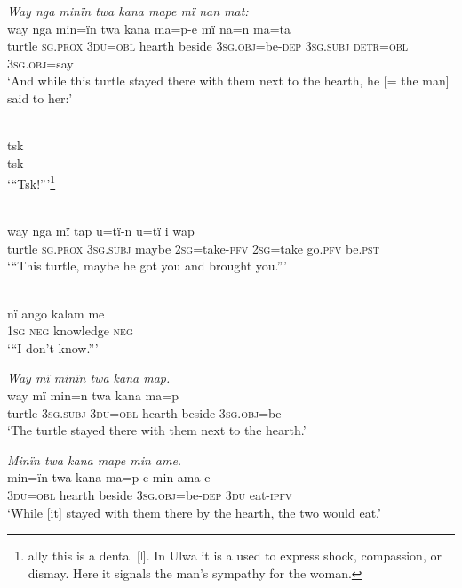 \ex \negmedspace \textit{Way nga min}{\textit{ï}}\textit{n twa k}{\textit{a}}\textit{na mape mï nan mat:}\\
\gll way  nga      min{=}{ï}{n} t{wa} k{a}na  {m}a{=}p{{}-}e      mï na{=}n ma{=}ta\\
turtle  \textsc{sg.prox}  3\textsc{du=obl}  hearth  beside  3\textsc{sg.obj}=be-\textsc{dep}  \textsc{3sg.subj} \textsc{detr=obl}  3\textsc{sg.obj}=say\\
\glt ‘And while this turtle stayed there with them next to the hearth, he [= the man] {said} to her:’

\ex {}\\
\gll tsk\\
tsk\\
\glt ‘“Tsk!”’\footnote{ally this is a  dental  [ǀ]. In Ulwa it is a  used to express shock, compassion, or dismay. Here it signals the man’s sympathy for the woman.}

\newpage

\ex {}\\
\gll way  nga      mï      tap    u=tï-n      u=tï    i    wap\\
turtle  \textsc{sg.prox}  3\textsc{sg.subj}  maybe  2\textsc{sg}=take-\textsc{pfv}  \textsc{2sg}=take  go.\textsc{pfv}  be.\textsc{pst}\\
\glt ‘“This turtle, maybe he got you and brought you.”’

\ex {}\\
\gll nï     ango  kalam      me\\
1\textsc{sg}  \textsc{neg}  knowledge    \textsc{neg}\\
\glt ‘“I don’t know.”’

\ex \negmedspace \textit{Way mï min}{\textit{ï}}\textit{n twa kana map.}\\
\gll way  mï      min=n t{wa} kana  ma{=}p\\
turtle  3\textsc{sg.subj}  3\textsc{du=obl}  hearth  beside  3\textsc{sg.obj}=be\\
\glt ‘The turtle stayed {there} with them next to the hearth.’

\ex \negmedspace \textit{Min}{\textit{ï}}\textit{n twa kana mape m}{\textit{i}}\textit{n ame.}\\
\gll min{=}{ï}{n} t{wa} kana  {m}a{=}p{{}-}e      m{i}n  ama-e\\
3\textsc{du=obl}  hearth  beside  \textsc{3sg.obj=}be-\textsc{dep}  3\textsc{du}  eat-\textsc{ipfv}\\
\glt ‘While [it] stayed with them {there} by the hearth, the two would eat.’

